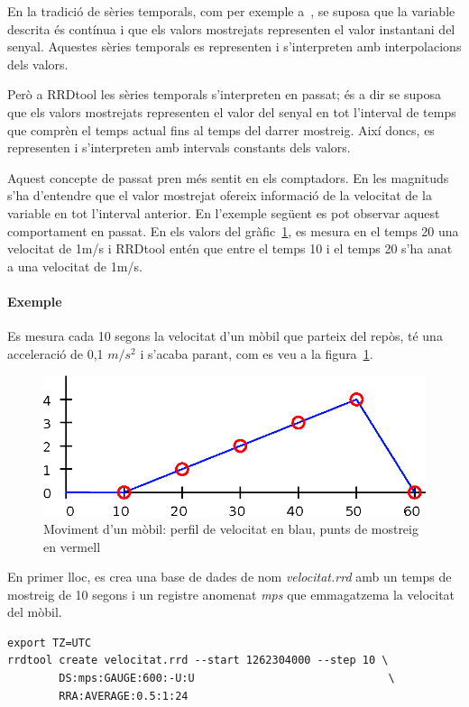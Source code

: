 En la tradició de sèries temporals, com per exemple a~\cite{assfalg08:_advan_analy_temp}, se suposa que la variable descrita és contínua i que els valors mostrejats representen el valor instantani del senyal. Aquestes sèries temporals es representen i s'interpreten amb interpolacions dels valors. 

Però a RRDtool les sèries temporals s'interpreten en passat; és a dir se suposa que els valors mostrejats representen el valor del senyal en tot l'interval de temps que comprèn el temps actual fins al temps del darrer mostreig. Així doncs, es representen i s'interpreten amb intervals constants dels valors.


Aquest concepte de passat pren més sentit en els comptadors. En les magnituds s'ha d'entendre que el valor mostrejat ofereix informació de la velocitat de la variable en tot l'interval anterior. En l'exemple següent es pot observar aquest comportament en passat. En els valors del gràfic~\ref{fig:rrdtool:mostreig_regular}, es mesura en el temps 20 una velocitat de 1m/s i RRDtool entén que entre el temps 10 i el temps 20 s'ha anat a una velocitat de 1m/s.


\paragraph{Exemple} Es mesura cada 10 segons la velocitat d'un mòbil que parteix del repòs, té una acceleració de 0,1 $m/s^2$ i s'acaba parant, com es veu a la figura~\ref{fig:rrdtool:mostreig_regular}. 

\begin{figure}[htp]
  \centering
  \includegraphics[width=\textwidth]{imatges/rrdtool/mostreig_regular.eps}
  \caption{Moviment d'un mòbil: perfil de velocitat en blau, punts de mostreig en vermell}
  \label{fig:rrdtool:mostreig_regular}
\end{figure}

En primer lloc, es crea una base de dades de nom \emph{velocitat.rrd} amb un temps de mostreig de 10 segons i un registre anomenat \emph{mps} que emmagatzema la velocitat del mòbil.
\begin{lstlisting}[style=sh]
export TZ=UTC
rrdtool create velocitat.rrd --start 1262304000 --step 10 \
        DS:mps:GAUGE:600:-U:U                              \ 
        RRA:AVERAGE:0.5:1:24                                                   
\end{lstlisting}



